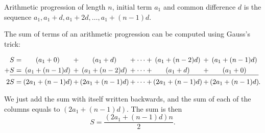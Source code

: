 \documentclass[12pt]{article}
\begin{document}
Arithmetic progression of length $n$, initial term $a_1$ and common difference $d$ is the sequence $a_1, a_1+d,a_1+2d,\dotsc,a_1+(n-1)d$.

The sum of terms of an arithmetic progression can be computed using Gauss's trick:

\parbox{\linewidth}{\begin{align*}
S&=\makebox[7em]{$(a_1+0)$}+\makebox[7em]{$(a_1+d)$}+\dotsb+\makebox[7em]{$(a_1+(n-2)d)$}
+\makebox[7em]{$(a_1+(n-1)d)$}\\
+\underline{S\vphantom{\makebox[7em]{$(a_1+(n-1)d)$}}}&\underline{{}=\makebox[7em]{$(a_1+(n-1)d)$}+
\makebox[7em]{$(a_1+(n-2)d)$}+\dotsb+\makebox[7em]{$(a_1+d)$}
+\makebox[7em]{$(a_1+0)$}}\\
2S&=\makebox[7em]{$(2a_1+(n-1)d)$}+\makebox[7em]{$(2a_1+(n-1)d)$}+\dotsb+\makebox[7em]{$(2a_1+(n-1)d)$}+
\makebox[7em]{$(2a_1+(n-1)d)$}.
\end{align*}}

We just add the sum with itself written backwards, and the sum of each of the columns equals to $(2a_1+(n-1)d)$. The sum is then
\begin{equation*}
S=\frac{(2a_1+(n-1)d)n}{2}.
\end{equation*}
\end{document}
